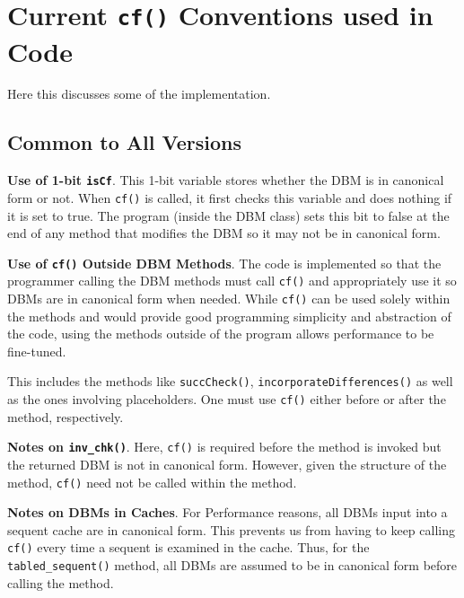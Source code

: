 \documentclass[11pt]{article}
\begin{document}
\section{Current \texttt{cf()} Conventions used in Code}

	Here this discusses some of the implementation.
	
\subsection{Common to All Versions}

\begin{enumeratepf}
	\item \textbf{Use of 1-bit \texttt{isCf}}.  This 1-bit variable stores whether the DBM is in canonical form or not.  When \texttt{cf()} is called, it first checks this variable and does nothing if it is set to true.  The program (inside the DBM class) sets this bit to false at the end of any method that modifies the DBM so it may not be in canonical form.
	\item \textbf{Use of \texttt{cf()} Outside DBM Methods}.  The code is implemented so that the programmer calling the DBM methods must call \texttt{cf()} and appropriately use it so DBMs are in canonical form when needed.  While \texttt{cf()} can be used solely within the methods and would provide good programming simplicity and abstraction of the code, using the methods outside of the program allows performance to be fine-tuned.
	
	This includes the methods like \texttt{succCheck()}, \texttt{incorporateDifferences()} as well as the ones involving placeholders.  One must use \texttt{cf()} either before or after the method, respectively.
	\item \textbf{Notes on \texttt{inv\_chk()}}.  Here, \texttt{cf()} is required before the method is invoked but the returned DBM is not in canonical form.  
	However, given the structure  of the method, \texttt{cf()} need not be called within the method.
	\item \textbf{Notes on DBMs in Caches}.  For Performance reasons, all DBMs input into a sequent cache are in canonical form.  This prevents us from having to keep calling \texttt{cf()} every time a sequent is examined in the cache.  Thus, for the \texttt{tabled\_sequent()} method, all DBMs are assumed to be in canonical form before calling the method.
\end{enumeratepf}
\end{document}
